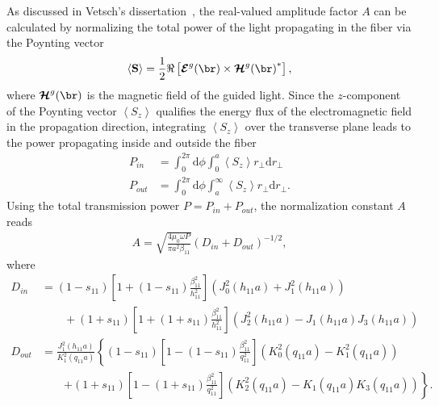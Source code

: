 \documentclass[]{report}
\begin{document}
As discussed in Vetsch's dissertation~\cite{Vetsch2010a}, the real-valued amplitude factor $ A $ can be calculated by normalizing the total power of the light propagating in the fiber via the Poynting vector
\begin{align}
\left<\mathbf{S}\right>=\frac{1}{2} \Re\left[\boldsymbol{\mathcal{E}}^g(\br)\times{\boldsymbol{\mathcal{H}}^g(\br)}^* \right],
\end{align}
where $ \boldsymbol{\mathcal{H}}^g(\br) $ is the magnetic field of the guided light. 
Since the $ z $-component of the Poynting vector $ \left< S_z\right> $ qualifies the energy flux of the electromagnetic field in the propagation direction, integrating $ \left< S_z \right> $ over the transverse plane leads to the power propagating inside and outside the fiber
\begin{align}
P_{in} &= \int_0^{2\pi} \mathrm{d}\phi \int_0^a \left< S_z \right> r_\perp \mathrm{d}r_\perp\\
P_{out} &= \int_0^{2\pi} \mathrm{d}\phi \int_a^\infty \left< S_z \right> r_\perp \mathrm{d}r_\perp.
\end{align}
Using the total transmission power $ P=P_{in}+P_{out} $, the normalization constant $ A $ reads
\begin{align}
A=\sqrt{\frac{4\mu_0\omega P}{\pi a^2 \beta_{11}}}\left(D_{in} + D_{out} \right)^{-1/2},
\end{align}
where
\begin{align}
D_{in} &= (1-s_{11})\left[ 1+(1-s_{11})\frac{\beta_{11}^2}{h_{11}^2}\right] \left(J_0^2(h_{11}a) + J_1^2(h_{11}a) \right) \nonumber\\
&\qquad + (1+s_{11})\left[ 1+(1+s_{11})\frac{\beta_{11}^2}{h_{11}^2}\right] \left(J_2^2(h_{11}a)- J_1(h_{11}a)J_3(h_{11}a) \right)\\
D_{out} &= \frac{J_1^2(h_{11}a)}{K_1^2(q_{11}a)}\left\{ (1-s_{11})\left[ 1-(1-s_{11})\frac{\beta_{11}^2}{q_{11}^2}\right] \left(K_0^2(q_{11}a) - K_1^2(q_{11}a) \right)\right. \nonumber\\
&\qquad \left. + (1\!+\! s_{11})\left[ 1\!-\! (1\!+\! s_{11})\frac{\beta_{11}^2}{q_{11}^2}\right] \left(K_2^2(q_{11}a)\! -\! K_1(q_{11}a)K_3(q_{11}a) \right) \right\}.
\end{align}
\end{document}
